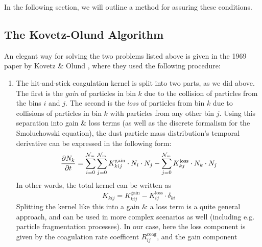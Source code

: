         In the following section, we will outline a method for assuring these conditions.

    \clearpage\subsection{The Kovetz-Olund Algorithm}
        
        An elegant way for solving the two problems listed above is given in the 1969 paper
        by Kovetz \& Olund \cite{kovetz_olund_1969}, where they used the following procedure:
        \begin{enumerate}
            \item The hit-and-stick coagulation kernel is split into two parts, as we did above.
                The first is the \textit{gain} of particles in bin $k$ due to the collision of 
                particles from the bins $i$ and $j$. The second is the \textit{loss} of particles 
                from bin $k$ due to collisions of particles in bin $k$ with particles from any 
                other bin $j$. 
                Using this separation into gain \& loss terms (as well as the discrete 
                formalism for the Smoluchowski equation), the dust particle mass 
                distribution's temporal derivative can be expressed in the following form:
                \begin{equation}
                    \frac{\partial N_k}{\partial t}
                        = \sum_{i=0}^{\mathcal N_m} \sum_{j=0}^{\mathcal N_m}
                            K_{kij}^\text{gain}\cdot N_i\cdot N_j
                        - \sum_{j=0}^{\mathcal N_m} K_{kj}^\text{loss} \cdot N_k\cdot N_j
                \end{equation}
                In other words, the total kernel can be written as
                \begin{equation}
                    K_{kij} = K_{kij}^\text{gain} - K_{ij}^\text{loss}\cdot\delta_{ki}
                \end{equation}
                Splitting the kernel like this into a gain \& a loss term is a quite general
                approach, and can be used in more complex scenarios as well (including e.g.
                particle fragmentation processes). In our case, here the loss component is given by 
                the coagulation rate coefficent $R_{ij}^\text{coag}$, and the gain component 

\end{enumerate}
